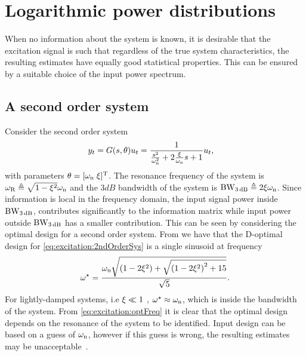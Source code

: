 

\section{Logarithmic power distributions}\label{sec:excitation:logarithmic}
When no information about the system is known, it is desirable that
the excitation signal is such that regardless of the true system characteristics,
the resulting estimates have equally good statistical properties.
This can be ensured by a suitable choice of the input power spectrum.

 \subsection{A second order system}
Consider the second order system
\begin{align}
y_t &= G(s,\theta) u_t = \frac{1}{\frac{s^2}{\omega_{\mathrm{n}}^2} + 2\frac{\xi}{\omega_{\mathrm{n}}}s + 1}u_t,
\label{eq:excitation:2ndOrderSys}
\end{align}
with parameters $\theta=[\omega_{\mathrm{n}}\;\xi]^{\mathrm{T}}$. The resonance frequency of the system is $\omega_{\mathrm{R}} \triangleq \sqrt{1-\xi^2}\omega_{\mathrm{n}}$
and the $3\unit{dB}$ bandwidth of the system is $\mathrm{BW}_{3\,\mathrm{dB}} \triangleq 2\xi\omega_{\mathrm{n}}$.
Since information is local in the frequency domain, the input signal power inside $\mathrm{BW}_{3\,\mathrm{dB}}$, contributes significantly to the information matrix while input power outside $\mathrm{BW}_{3\,\mathrm{dB}}$ has a smaller contribution. This can be seen by considering the optimal design for a second order system. From \citep[Example 6.4.5]{Goodwin1977} we have that the D-optimal design for \eqref{eq:excitation:2ndOrderSys} is a single sinusoid at frequency
\begin{align}
\omega^\star =\frac%
{\wn
  \sqrt{
    \left(1-2\damping^2\right)
    +
    \sqrt{\left(1-2\damping^2\right)^2+15}
    }
  }
{\sqrt{5}}.
\label{eq:excitation:optFreq}
\end{align}
For lightly-damped systems, i.e $\xi \ll 1$ , $\omega^\star\approx \omega_{\mathrm{n}}$, which is inside the bandwidth of the system. 
From \eqref{eq:excitation:optFreq} it is clear that the optimal design depends on the resonance of the system to be identified. 
Input design can be based on a guess of $\omega_{\mathrm{n}}$, however if this guess is wrong, the resulting estimates may be unacceptable~\citep{Rojas2007}.

